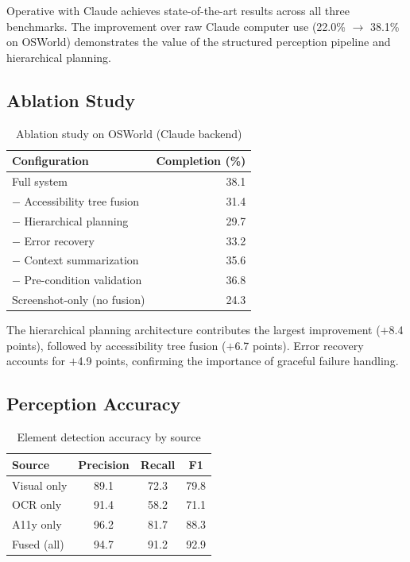 Operative with Claude achieves state-of-the-art results across all three benchmarks. The improvement over raw Claude computer use (22.0\% $\rightarrow$ 38.1\% on OSWorld) demonstrates the value of the structured perception pipeline and hierarchical planning.

\subsection{Ablation Study}

\begin{table}[t]
\centering
\caption{Ablation study on OSWorld (Claude backend)}
\label{tab:ablation}
\begin{tabular}{@{}lr@{}}
\toprule
\textbf{Configuration} & \textbf{Completion (\%)} \\
\midrule
Full system & 38.1 \\
$-$ Accessibility tree fusion & 31.4 \\
$-$ Hierarchical planning & 29.7 \\
$-$ Error recovery & 33.2 \\
$-$ Context summarization & 35.6 \\
$-$ Pre-condition validation & 36.8 \\
Screenshot-only (no fusion) & 24.3 \\
\bottomrule
\end{tabular}
\end{table}

The hierarchical planning architecture contributes the largest improvement ($+$8.4 points), followed by accessibility tree fusion ($+$6.7 points). Error recovery accounts for $+$4.9 points, confirming the importance of graceful failure handling.

\subsection{Perception Accuracy}

\begin{table}[t]
\centering
\caption{Element detection accuracy by source}
\label{tab:perception}
\begin{tabular}{@{}lccc@{}}
\toprule
\textbf{Source} & \textbf{Precision} & \textbf{Recall} & \textbf{F1} \\
\midrule
Visual only & 89.1 & 72.3 & 79.8 \\
OCR only & 91.4 & 58.2 & 71.1 \\
A11y only & 96.2 & 81.7 & 88.3 \\
Fused (all) & 94.7 & 91.2 & 92.9 \\
\bottomrule
\end{tabular}
\end{table}

